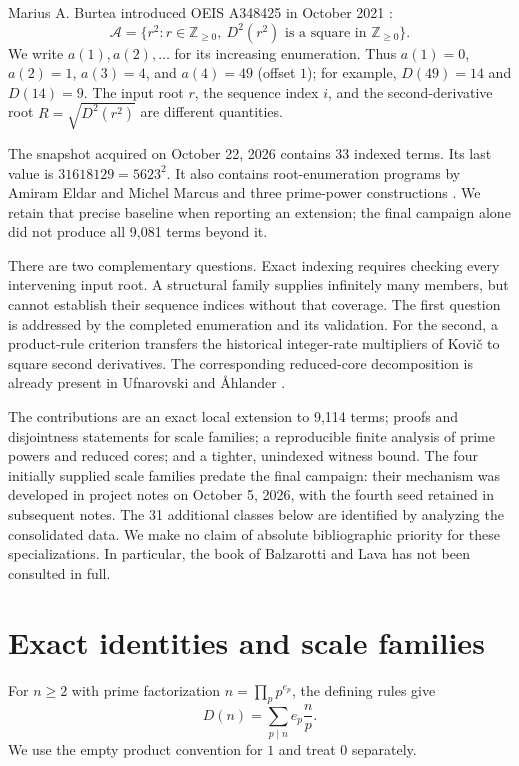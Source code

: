 \documentclass[11pt]{article}
\theoremstyle{definition}
\theoremstyle{remark}
\newcommand{\NN}{\mathbb Z_{\geq0}}
\begin{document}
Marius A. Burtea introduced OEIS A348425 in October 2021 \cite{oeis}:
\begin{equation}\label{eq:set}
 \mathcal A=\{r^{2}:r\in\NN,\ D^{2}(r^{2})\text{ is a square in }\NN\}.
\end{equation}
We write $a(1),a(2),\ldots$ for its increasing enumeration. Thus
$a(1)=0$, $a(2)=1$, $a(3)=4$, and $a(4)=49$ (offset $1$); for example,
$D(49)=14$ and $D(14)=9$. The input root $r$, the sequence index $i$, and
the second-derivative root $R=\sqrt{D^{2}(r^{2})}$ are different quantities.

The snapshot acquired on October 22, 2026 contains 33 indexed terms.
Its last value is $31618129=5623^{2}$. It also contains root-enumeration programs by
Amiram Eldar and Michel Marcus and three prime-power constructions
\cite{oeis}. We retain that precise baseline when reporting an extension;
the final campaign alone did not produce all 9,081 terms beyond it.

There are two complementary questions. Exact indexing requires checking
every intervening input root. A structural family supplies infinitely many
members, but cannot establish their sequence indices without that coverage.
The first question is addressed by the completed enumeration and its
validation. For the second, a product-rule criterion transfers the historical
integer-rate multipliers of Kovi\v{c} \cite[Proposition 2]{kovic} to square
second derivatives. The corresponding reduced-core decomposition is already
present in Ufnarovski and \AA hlander \cite[Section 8]{ufn}.

The contributions are an exact local extension to 9,114 terms; proofs and
disjointness statements for scale families; a reproducible finite analysis
of prime powers and reduced cores; and a tighter, unindexed witness bound.
The four initially supplied scale families predate the final campaign:
their mechanism was developed in project notes on October 5, 2026, with
the fourth seed retained in subsequent notes. The
31 additional classes below are identified by analyzing the consolidated
data. We make no claim of absolute bibliographic priority for these
specializations. In particular, the book of Balzarotti and Lava
\cite{book} has not been consulted in full.

\section{Exact identities and scale families}\label{sec:math}
For $n\geq2$ with prime factorization $n=\prod_p p^{e_p}$, the defining
rules give
\begin{equation}\label{eq:factor}
 D(n)=\sum_{p\mid n}e_p\frac{n}{p}.
\end{equation}
We use the empty product convention for $1$ and treat $0$ separately.
\end{document}

